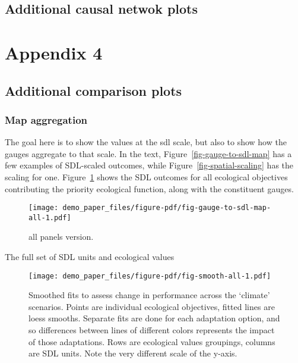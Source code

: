 \documentclass[
  number]{elsarticle}
\let\oldparagraph\paragraph
\renewcommand{\paragraph}[1]{\oldparagraph{#1}\mbox{}}
\begin{document}
\hypertarget{additional-causal-netwok-plots}{%
\subsection{Additional causal netwok
plots}\label{additional-causal-netwok-plots}}

\hypertarget{section}{%
\paragraph{}\label{section}}

\hypertarget{appendix-4}{%
\section{Appendix 4}\label{appendix-4}}

\hypertarget{additional-comparison-plots}{%
\subsection{Additional comparison
plots}\label{additional-comparison-plots}}

\hypertarget{sec-map-versions}{%
\subsubsection{Map aggregation}\label{sec-map-versions}}

The goal here is to show the values at the sdl scale, but also to show
how the gauges aggregate to that scale. In the text,
Figure~\ref{fig-gauge-to-sdl-map} has a few examples of SDL-scaled
outcomes, while Figure~\ref{fig-spatial-scaling} has the scaling for
one. Figure~\ref{fig-gauge-to-sdl-map-all} shows the SDL outcomes for
all ecological objectives contributing the priority ecological function,
along with the constituent gauges.

\begin{figure}

{\centering \texttt{[image: demo\_paper\_files/figure-pdf/fig-gauge-to-sdl-map-all-1.pdf]}

}

\caption{\label{fig-gauge-to-sdl-map-all}all panels version.}

\end{figure}

The full set of SDL units and ecological values

\begin{figure}

{\centering \texttt{[image: demo\_paper\_files/figure-pdf/fig-smooth-all-1.pdf]}

}

\caption{\label{fig-smooth-all}Smoothed fits to assess change in
performance across the `climate' scenarios. Points are individual
ecological objectives, fitted lines are loess smooths. Separate fits are
done for each adaptation option, and so differences between lines of
different colors represents the impact of those adaptations. Rows are
ecological values groupings, columns are SDL units. Note the very
different scale of the y-axis.}

\end{figure}
\end{document}

